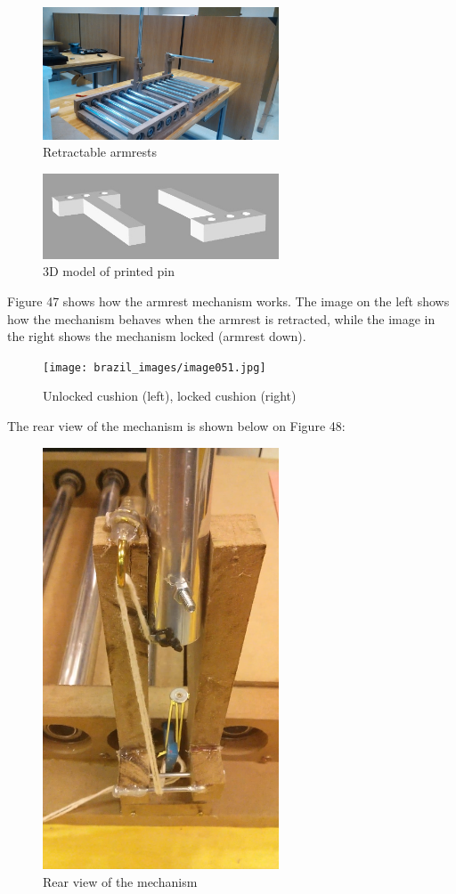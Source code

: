 \begin{figure}[h]
\centering
\includegraphics[width=7cm]{brazil_images/image049.jpg}
\caption{Retractable armrests}
\label{fig:retractable_armrest}
\end{figure}


\begin{figure}[h]
\centering
\includegraphics[width=7cm]{brazil_images/image050.png}
\caption{3D model of printed pin}
\label{fig:model_printed_pin}
\end{figure}

Figure 47 shows how the armrest mechanism works. The image on the left shows how the mechanism behaves when the armrest is retracted, while the image in the right shows the mechanism locked (armrest down).

\begin{figure}[h]
\centering
\texttt{[image: brazil\_images/image051.jpg]}
\caption{Unlocked cushion (left), locked cushion (right)}
\label{fig:cushion}
\end{figure}


The rear view of the mechanism is shown below on Figure 48:

\begin{figure}[h]
\centering
\includegraphics[width=7cm]{brazil_images/image053.png}
\caption{Rear view of the mechanism}
\label{fig:rear_view}
\end{figure}


